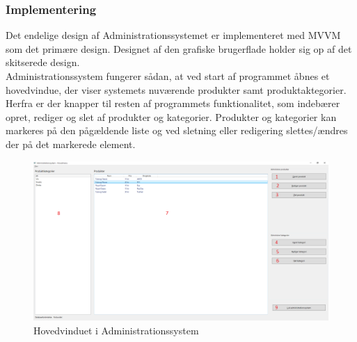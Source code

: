 \subsubsection{Implementering}
Det endelige design af Administrationssystemet er implementeret med MVVM som det primære design. Designet af den grafiske brugerflade holder sig op af det skitserede design.\\
Administrationssystem fungerer sådan, at ved start af programmet åbnes et hovedvindue, der viser systemets nuværende produkter samt produktaktegorier. Herfra er der knapper til resten af programmets funktionalitet, som indebærer opret, rediger og slet af produkter og kategorier. Produkter og kategorier kan markeres på den pågældende liste og ved sletning eller redigering slettes/ændres der på det markerede element.\\

\begin{figure}[H]
	\centering
	\includegraphics[width=\textwidth]{Projektbeskrivelse/DesignOgImplementering/Images/BackendDemo}
	\caption{Hovedvinduet i Administrationssystem}
	\label{fig:admindemo}
\end{figure}

